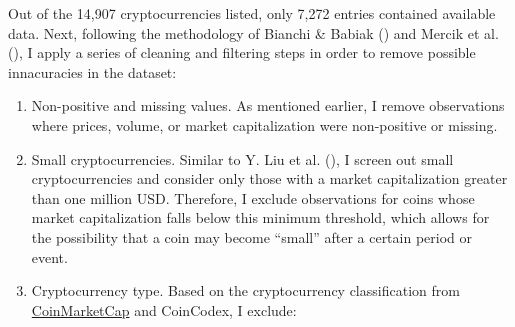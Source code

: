 \documentclass[
  12pt,
  a4paper,
  openany]{scrbook}
\begin{document}
Out of the 14,907 cryptocurrencies listed, only 7,272 entries contained
available data. Next, following the methodology of Bianchi \& Babiak
() and Mercik
et al.
(),
I apply a series of cleaning and filtering steps in order to remove
possible innacuracies in the dataset:

\begin{enumerate}
\def\labelenumi{\arabic{enumi}.}
\item
  Non-positive and missing values. As mentioned earlier, I remove
  observations where prices, volume, or market capitalization were
  non-positive or missing.
\item
  Small cryptocurrencies. Similar to Y. Liu et al.
  (), I screen out small
  cryptocurrencies and consider only those with a market capitalization
  greater than one million USD. Therefore, I exclude observations for
  coins whose market capitalization falls below this minimum threshold,
  which allows for the possibility that a coin may become ``small''
  after a certain period or event.
\item
  Cryptocurrency type. Based on the cryptocurrency classification from
  \href{https://coinmarketcap.com/cryptocurrency-category/}{CoinMarketCap}
  and CoinCodex, I exclude:


\end{enumerate}
\end{document}
